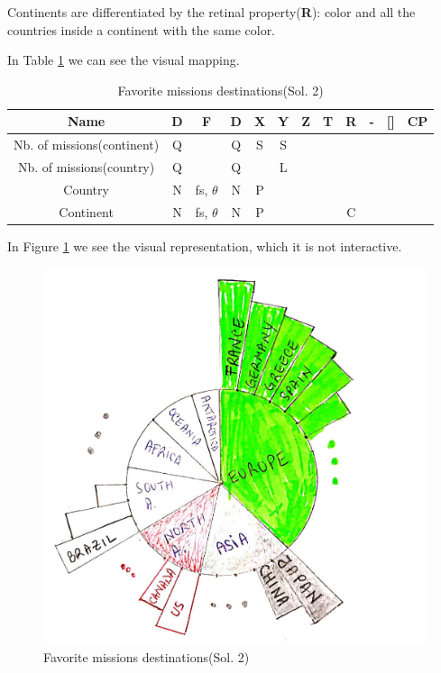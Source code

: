 \documentclass{article}
\begin{document}
Continents are differentiated by the retinal property(\textbf{R}): color and all the countries inside a continent with the same color.

In Table \ref{table4} we can see the visual mapping.



\begin{table}[h!]
	\begin{center}
		\begin{tabular}{|c | c | c | c || c | c | c | c | c| c| c || c|} 
			\hline
			Name & D & F & D\textquotesingle  & X & Y & Z & T & R & -& [] & CP \\ [0.5ex] 
			\hline\hline
			Nb. of missions(continent) & Q &  & Q &  S &  S &   &   &   &   &   &   \\ [0.5ex] 
			\hline
			Nb. of missions(country) & Q &  & Q &   &  L &   &   &   &   &   &   \\ [0.5ex] 
			\hline
			Country  & N & fs, $\theta$ & N & P &   &   &   &   &   &   &   \\ [0.5ex] 
			\hline
			Continent  & N & fs, $\theta$ & N & P &   &   &   & C  &   &   &   \\ [0.5ex] 
			\hline
			
		\end{tabular}
		\caption{Favorite missions destinations(Sol. 2)}
		\label{table4}
	\end{center}
\end{table}
In Figure \ref{fig:fav_dest2} we see the visual representation, which it is not interactive.
\begin{figure}[H]
	\centering
	\includegraphics[scale=0.16]{img/5.jpg}
	\caption{Favorite missions destinations(Sol. 2)}
	\label{fig:fav_dest2}
\end{figure}
\end{document}
